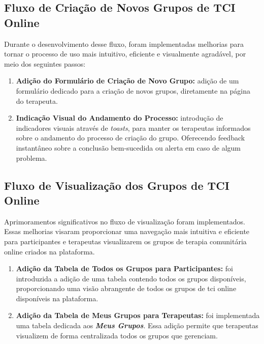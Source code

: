 \subsection{Fluxo de Criação de Novos Grupos de TCI Online}

    Durante o desenvolvimento desse fluxo, foram implementadas melhorias para tornar o processo de uso mais intuitivo, eficiente e visualmente agradável, por meio dos seguintes passos:
\begin{enumerate}
    
    \item \textbf{Adição do Formulário de Criação de Novo Grupo:} adição de um formulário dedicado para a criação de novos grupos, diretamente na página do terapeuta.
    
    \item \textbf{Indicação Visual do Andamento do Processo:} introdução de indicadores visuais através de \textit{toasts}, para manter os terapeutas informados sobre o andamento do processo de criação do grupo. Oferecendo feedback instantâneo sobre a conclusão bem-sucedida ou alerta em caso de algum problema.
\end{enumerate}
    
\subsection{Fluxo de Visualização dos Grupos de TCI Online}
    Aprimoramentos significativos no fluxo de visualização foram implementados. Essas melhorias visaram proporcionar uma navegação mais intuitiva e eficiente para participantes e terapeutas visualizarem os grupos de terapia comunitária online criados na plataforma.
\begin{enumerate}
    \item \textbf{Adição da Tabela de Todos os Grupos para Participantes:} foi introduzida a adição de uma tabela contendo todos os grupos disponíveis, proporcionando uma visão abrangente de todos os grupos de tci online disponíveis na plataforma.
    \item \textbf{Adição da Tabela de Meus Grupos para Terapeutas:} foi implementada uma tabela dedicada aos \textit{\textbf{Meus Grupos}}. Essa adição permite que terapeutas visualizem de forma centralizada todos os grupos que gerenciam.
\end{enumerate}

